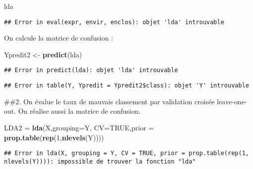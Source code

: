 \documentclass[
]{article}
\newenvironment{Shaded}{\begin{snugshade}}{\end{snugshade}}
\newcommand{\DataTypeTok}[1]{\textcolor[rgb]{0.13,0.29,0.53}{#1}}
\newcommand{\DecValTok}[1]{\textcolor[rgb]{0.00,0.00,0.81}{#1}}
\newcommand{\KeywordTok}[1]{\textcolor[rgb]{0.13,0.29,0.53}{\textbf{#1}}}
\newcommand{\NormalTok}[1]{#1}
\newcommand{\OperatorTok}[1]{\textcolor[rgb]{0.81,0.36,0.00}{\textbf{#1}}}
\newcommand{\OtherTok}[1]{\textcolor[rgb]{0.56,0.35,0.01}{#1}}
\newcommand{\StringTok}[1]{\textcolor[rgb]{0.31,0.60,0.02}{#1}}
\begin{document}
\begin{Shaded}
\begin{Highlighting}[]
\NormalTok{lda}
\end{Highlighting}
\end{Shaded}

\begin{verbatim}
## Error in eval(expr, envir, enclos): objet 'lda' introuvable
\end{verbatim}

On calcule la matrice de confusion :

\begin{Shaded}
\begin{Highlighting}[]
\NormalTok{Ypredit2 <-}\StringTok{ }\KeywordTok{predict}\NormalTok{(lda)}
\end{Highlighting}
\end{Shaded}

\begin{verbatim}
## Error in predict(lda): objet 'lda' introuvable
\end{verbatim}

\begin{Shaded}
\end{Shaded}

\begin{verbatim}
## Error in table(Y, Ypredit = Ypredit2$class): objet 'Y' introuvable
\end{verbatim}

\#\#2. On évalue le taux de mauvais classement par validation croisée
leave-one-out. On réalise aussi la matrice de confusion.

\begin{Shaded}
\begin{Highlighting}[]
\NormalTok{LDA2 =}\StringTok{ }\KeywordTok{lda}\NormalTok{(X,}\DataTypeTok{grouping=}\NormalTok{Y, }\DataTypeTok{CV=}\OtherTok{TRUE}\NormalTok{,}\DataTypeTok{prior =} \KeywordTok{prop.table}\NormalTok{(}\KeywordTok{rep}\NormalTok{(}\DecValTok{1}\NormalTok{,}\KeywordTok{nlevels}\NormalTok{(Y))))}
\end{Highlighting}
\end{Shaded}

\begin{verbatim}
## Error in lda(X, grouping = Y, CV = TRUE, prior = prop.table(rep(1, nlevels(Y)))): impossible de trouver la fonction "lda"
\end{verbatim}
\end{document}
